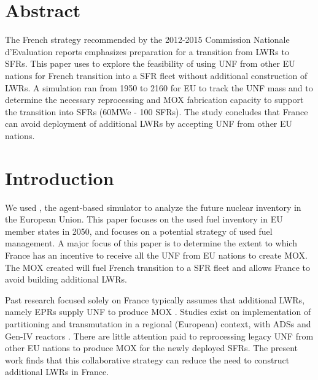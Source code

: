 \section{Abstract}
The French strategy recommended by the 2012-2015 Commission Nationale d'Evaluation reports
\cite{noauthor_cne2_nodate} emphasizes preparation for a transition from \glspl{LWR} to \glspl{SFR}.
This paper uses \Cyclus to explore the feasibility of using \gls{UNF} from other EU nations
for French transition into a \gls{SFR} fleet without additional construction of \glspl{LWR}.
A \Cyclus simulation ran from 1950 to 2160 for EU to track the \gls{UNF} mass
and to determine the necessary reprocessing and \gls{MOX} fabrication capacity to support
the transition into \glspl{SFR} (60MWe - 100 \glspl{SFR}). The study concludes that France can avoid deployment
of additional \glspl{LWR} by accepting \gls{UNF} from other EU nations.


\section{Introduction}
We used \Cyclus, the agent-based simulator \cite{huff_fundamental_2016} to analyze
the future nuclear inventory in the European Union. This paper focuses on the used fuel
inventory in \gls{EU} member states in 2050, and focuses on a potential strategy of used fuel
management.
A major focus of this paper is to determine the extent to which France has an incentive
to receive all the \gls{UNF} from \gls{EU} nations to create \gls{MOX}.
The \gls{MOX} created will fuel French transition to a \gls{SFR} fleet
and allows France to avoid building additional \glspl{LWR}.

Past research focused solely on France typically assumes that additional \glspl{LWR},
namely \glspl{EPR} supply \gls{UNF} to produce \gls{MOX} \cite{carre_overview_2009, martin_symbiotic_2017, freynet_multiobjective_2016}.
Studies exist on implementation of partitioning and transmutation
in a regional (European) context, with \glspl{ADS} and Gen-IV reactors \cite{fazio_study_2013}.
There are little attention paid to reprocessing legacy \gls{UNF} from other
EU nations to produce \gls{MOX} for the newly deployed \glspl{SFR}.
The present work finds that this collaborative strategy can reduce the
need to construct additional \glspl{LWR} in France.

